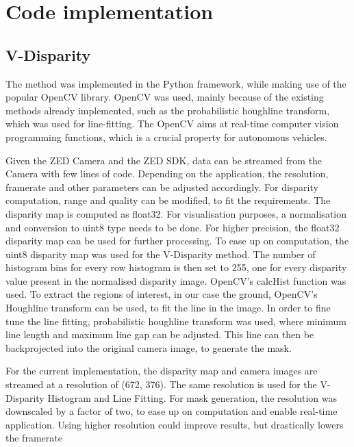 \section{Code implementation}
\subsection{V-Disparity}

The method was implemented in the Python framework, while making use of the popular OpenCV library. OpenCV was used, mainly because of the existing methods already implemented, such as the probabilistic houghline transform, which was used for line-fitting. The OpenCV aims at real-time computer vision programming functions, which is a crucial property for autonomous vehicles.
\newline

Given the ZED Camera and the ZED SDK, data can be streamed from the Camera with few lines of code. Depending on the application, the resolution, framerate and other parameters can be adjusted accordingly. For disparity computation, range and quality can be modified, to fit the requirements.
The disparity map is computed as float32. For visualisation purposes, a normalisation and conversion to uint8 type needs to be done. 
For higher precision, the float32 disparity map can be used for further processing. 
To ease up on computation, the uint8 disparity map was used for the V-Disparity method. The number of histogram bins for every row histogram is then set to 255, one for every disparity value present in the normalised disparity image. OpenCV's calcHist function was used.
To extract the regions of interest, in our case the ground, OpenCV's Houghline transform can be used, to fit the line in the image. In order to fine tune the line fitting, probabilistic houghline transform was used, where minimum line length and maximum line gap can be adjusted. This line can then be backprojected into the original camera image, to generate the mask.

For the current implementation, the disparity map and camera images are streamed at a resolution of (672, 376). The same resolution is used for the V-Disparity Histogram and Line Fitting. For mask generation, the resolution was downscaled by a factor of two, to ease up on computation and enable real-time application. Using higher resolution could improve results, but drastically lowers the framerate



